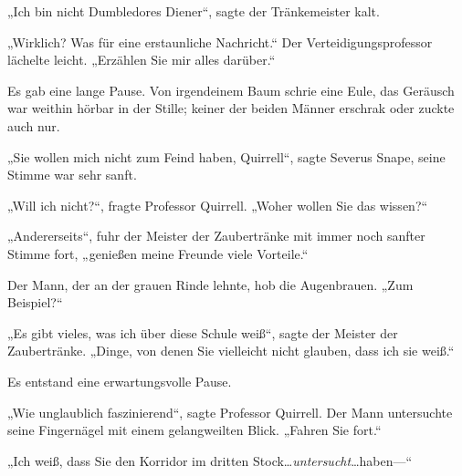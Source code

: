 „Ich bin nicht Dumbledores Diener“, sagte der Tränkemeister kalt.

„Wirklich? Was für eine erstaunliche Nachricht.“ Der Verteidigungsprofessor lächelte leicht. „Erzählen Sie mir alles darüber.“

Es gab eine lange Pause. Von irgendeinem Baum schrie eine Eule, das Geräusch war weithin hörbar in der Stille; keiner der beiden Männer erschrak oder zuckte auch nur.

„Sie wollen mich nicht zum Feind haben, Quirrell“, sagte Severus Snape, seine Stimme war sehr sanft.

„Will ich nicht?“, fragte Professor Quirrell. „Woher wollen Sie das wissen?“

„Andererseits“, fuhr der Meister der Zaubertränke mit immer noch sanfter Stimme fort, „genießen meine Freunde viele Vorteile.“

Der Mann, der an der grauen Rinde lehnte, hob die Augenbrauen. „Zum Beispiel?“

„Es gibt vieles, was ich über diese Schule weiß“, sagte der Meister der Zaubertränke. „Dinge, von denen Sie vielleicht nicht glauben, dass ich sie weiß.“

Es entstand eine erwartungsvolle Pause.

„Wie unglaublich faszinierend“, sagte Professor Quirrell. Der Mann untersuchte seine Fingernägel mit einem gelangweilten Blick. „Fahren Sie fort.“

„Ich weiß, dass Sie den Korridor im dritten Stock…\emph{untersucht}…haben—“

